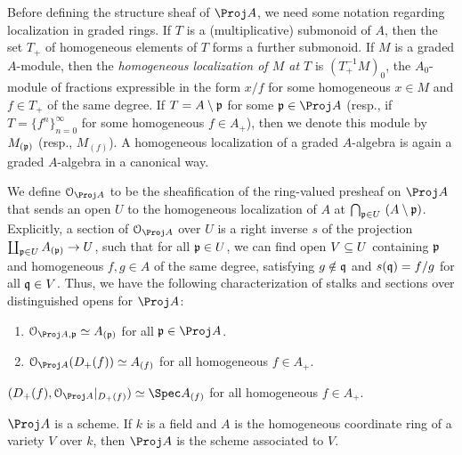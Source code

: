 \documentclass[10pt,final,oneside]{amsbook}
\numberwithin{equation}{section}
\begin{document}
Before defining the structure sheaf of $\Proj A$, we need some notation regarding localization in graded rings.
If $T$ is a (multiplicative) submonoid of $A$, then the set $T_+$ of homogeneous elements of $T$ forms a further submonoid.
If $M$ is a graded $A$-module, then the \emph{homogeneous localization of $M$ at $T$} is $(T_+^{-1}M)_0$, the $A_0$-module of fractions expressible in the form $x/f$ for some homogeneous $x \in M$ and $f \in T_+$ of the same degree.
If $T = A \setminus \mathfrak{p}$ for some $\fr{p} \in \Proj A$ (resp., if $T = \{f^n\}_{n = 0}^\infty$ for some homogeneous $f \in A_+$), then we denote this module by $M_{(\mathfrak{p})}$ (resp., $M_{(f)}$).
A homogeneous localization of a graded $A$-algebra is again a graded $A$-algebra in a canonical way.


We define $\cal{O}_{\Proj A}$ to be the sheafification of  the ring-valued presheaf on $\Proj A$ that sends an open $U$ to the homogeneous localization of $A$ at  $\bigcap_{\mathfrak{p} \in U}~(A \setminus \mathfrak{p})$.
Explicitly, a section of $\cal{O}_{\Proj A}$ over $U$ is a right inverse $s$ of the projection $\coprod_{\mathfrak{p} \in U} A_{(\mathfrak{p})} \to U$, such that for all $\mathfrak{p} \in U$, we can find open $V \subseteq U$ containing $\mathfrak{p}$ and homogeneous $f, g \in A$ of the same degree, satisfying $g \notin \mathfrak{q}$ and $s(\mathfrak{q}) = f/g$ for all $\mathfrak{q} \in V$.
Thus, we have the following characterization of stalks and sections over distinguished opens for $\Proj A$:

\begin{prop}\mbox{}
\begin{enumerate}
\item 	$\cal{O}_{\Proj A, \fr{p}} \simeq A_{(\fr{p})}$ for all $\fr{p} \in \Proj A$.
\item 	$\cal{O}_{\Proj A}(D_+(f)) \simeq A_{(f)}$ for all homogeneous $f \in A_+$.
\end{enumerate}
\end{prop}

\begin{cor}
$(D_+(f), \cal{O}_{\Proj A}|_{D_+(f)}) \simeq \Spec A_{(f)}$ for all homogeneous $f \in A_+$.
\end{cor}

\begin{cor}
$\Proj A$ is a scheme.
If $k$ is a field and $A$ is the homogeneous coordinate ring of a variety $V$ over $k$, then $\Proj A$ is the scheme associated to $V$.
\end{cor}
\end{document}
